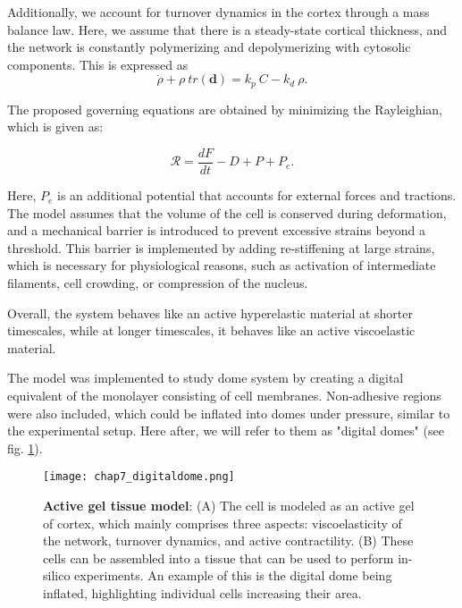 Additionally, we account for turnover dynamics in the cortex through a mass balance law. Here, we assume that there is a steady-state cortical thickness, and the network is constantly polymerizing and depolymerizing with cytosolic components. This is expressed as $$\dot{\rho} + \rho \ tr(\mathbf{d}) = k_p\ C - k_d\ \rho.$$

The proposed governing equations are obtained by minimizing the Rayleighian, which is given as:

$$ \mathcal{R} = \frac{dF}{dt} - D + P + P_e .$$

Here, $P_e$ is an additional potential that accounts for external forces and tractions. The model assumes that the volume of the cell is conserved during deformation, and a mechanical barrier is introduced to prevent excessive strains beyond a threshold. This barrier is implemented by adding re-stiffening at large strains, which is necessary for physiological reasons, such as activation of intermediate filaments, cell crowding, or compression of the nucleus.

Overall, the system behaves like an active hyperelastic material at shorter timescales, while at longer timescales, it behaves like an active viscoelastic material.

The model was implemented to study dome system by creating a digital equivalent of the monolayer consisting of cell membranes. Non-adhesive regions were also included, which could be inflated into domes under pressure, similar to the experimental setup. Here after, we will refer to them as "digital domes" (see fig. \ref{fig_7_2}).


\begin{figure}[]
	\centering
	\texttt{[image: chap7\_digitaldome.png]}
	\caption{\label{fig_7_2} \textbf{Active gel tissue model}: (A) The cell is modeled as an active gel of cortex, which mainly comprises three aspects: viscoelasticity of the network, turnover dynamics, and active contractility. (B) These cells can be assembled into a tissue that can be used to perform in-silico experiments. An example of this is the digital dome being inflated, highlighting individual cells increasing their area.}
\end{figure}

